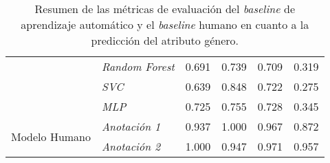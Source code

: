 \begin{table}[htpb]
{\begin{tabular}{llcccc}
                                            & \emph{Random Forest}        & 0.691 & 0.739 & 0.709 & 0.319\\
        \cmidrule{2-6}
                                            & \emph{SVC}                  & 0.639 & 0.848 & 0.722 & 0.275\\
        \cmidrule{2-6}
                                            & \emph{MLP}                  & 0.725 & 0.755 & 0.728 & 0.345\\
        \midrule\midrule
        \multirow{2}{*}{Modelo Humano}      & \emph{Anotaci\'on 1}        & 0.937 & 1.000 & 0.967 & 0.872\\
        \cmidrule{2-6}
                                            & \emph{Anotaci\'on 2}        & 1.000 & 0.947 & 0.971 & 0.957\\
        \bottomrule
        \end{tabular}}
    \caption{Resumen de las m\'etricas de evaluaci\'on del \emph{baseline} de aprendizaje autom\'atico y el \emph{baseline} humano 
    en cuanto a la predicci\'on del atributo g\'enero.}
    \label{table:eval_baselines_gender}
\end{table}

